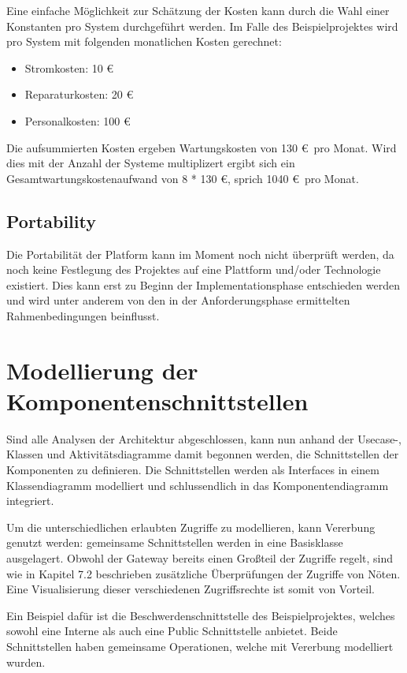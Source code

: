 Eine einfache Möglichkeit zur Schätzung der Kosten kann durch die Wahl einer Konstanten pro System durchgeführt werden. Im Falle des Beispielprojektes wird pro System mit folgenden monatlichen Kosten gerechnet:

\begin{itemize}
  \item Stromkosten: 10 \euro
  \item Reparaturkosten: 20 \euro
  \item Personalkosten: 100 \euro
\end{itemize}

Die aufsummierten Kosten ergeben Wartungskosten von 130 \euro \ pro Monat. Wird dies mit der Anzahl der Systeme multiplizert ergibt sich ein Gesamtwartungskostenaufwand von 8 * 130 \euro, sprich 1040 \euro \ pro Monat.

\subsection{Portability}
Die Portabilität der Platform kann im Moment noch nicht überprüft werden, da noch keine Festlegung des Projektes auf eine Plattform und/oder Technologie existiert. Dies kann erst zu Beginn der Implementationsphase entschieden werden und wird unter anderem von den in der Anforderungsphase ermittelten Rahmenbedingungen beinflusst.


\section{Modellierung der Komponentenschnittstellen}
Sind alle Analysen der Architektur abgeschlossen, kann nun anhand der Usecase-, Klassen und Aktivitätsdiagramme damit begonnen werden, die Schnittstellen der Komponenten zu definieren. Die Schnittstellen werden als Interfaces in einem Klassendiagramm modelliert und schlussendlich in das Komponentendiagramm integriert.

Um die unterschiedlichen erlaubten Zugriffe zu modellieren, kann Vererbung genutzt werden: gemeinsame Schnittstellen werden in eine Basisklasse ausgelagert. Obwohl der Gateway bereits einen Großteil der Zugriffe regelt, sind wie in Kapitel 7.2 beschrieben zusätzliche Überprüfungen der Zugriffe von Nöten. Eine Visualisierung dieser verschiedenen Zugriffsrechte ist somit von Vorteil.

Ein Beispiel dafür ist die Beschwerdenschnittstelle des Beispielprojektes, welches sowohl eine Interne als auch eine Public Schnittstelle anbietet. Beide Schnittstellen haben gemeinsame Operationen, welche mit Vererbung modelliert wurden.

